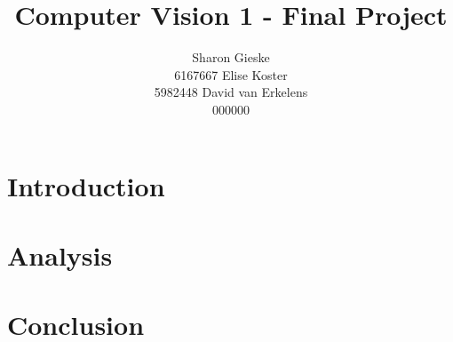\documentclass[12pt,a4paper]{article}
\title{Computer Vision 1 - Final Project}
\author{
Sharon Gieske \\6167667
Elise Koster \\5982448
David van Erkelens \\000000
}
\date{}
\begin{document}
\maketitle
{}
\titleformat{\subsection}[runin]{\normalsize\bfseries}{}{0pt}{#1 \thesubsection\newline}

\section{Introduction}
\section{Analysis}
\section{Conclusion}
\end{document}
